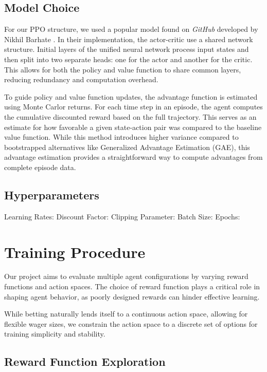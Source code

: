 \documentclass[sigconf]{acmart}
\begin{document}
\subsection{Model Choice}
   For our PPO structure, we used a popular model found on \textit{GitHub} developed by Nikhil Barhate \cite{barhate2020ppo}. In their implementation, the actor-critic use a shared network structure. Initial layers of the unified neural network process input states and then split into two separate heads: one for the actor and another for the critic. This allows for both the policy and value function to share common layers, reducing redundancy and computation overhead.

   To guide policy and value function updates, the advantage function is estimated using Monte Carlor returns. For each time step in an episode, the agent computes the cumulative discounted reward based on the full trajectory. This serves as an estimate for how favorable a given state-action pair was compared to the baseline value function. While this method introduces higher variance compared to bootstrapped alternatives like Generalized Advantage Estimation (GAE), this advantage estimation provides a straightforward way to compute advantages from complete episode data. 

\subsection{Hyperparameters}
Learning Rates: 
Discount Factor:
Clipping Parameter:
  Batch Size:
  Epochs:

\section{Training Procedure}

Our project aims to evaluate multiple agent configurations by varying reward functions and action spaces. The choice of reward function plays a critical role in shaping agent behavior, as poorly designed rewards can hinder effective learning.

While betting naturally lends itself to a continuous action space, allowing for flexible wager sizes, we constrain the action space to a discrete set of options for training simplicity and stability.

\subsection{Reward Function Exploration}
\end{document}

